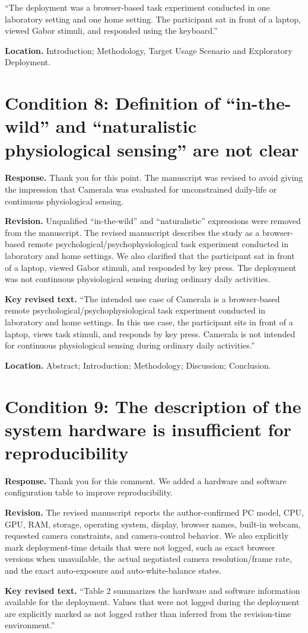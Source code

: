 \documentclass[11pt]{article}
\newcommand{\condition}[2]{\section*{Condition #1: #2}}
\begin{document}
``The deployment was a browser-based task experiment conducted in one laboratory setting and one home setting. The participant sat in front of a laptop, viewed Gabor stimuli, and responded using the keyboard.''

\textbf{Location.}
Introduction; Methodology, Target Usage Scenario and Exploratory Deployment.

\condition{8}{Definition of ``in-the-wild'' and ``naturalistic physiological sensing'' are not clear}
\textbf{Response.}
Thank you for this point.
The manuscript was revised to avoid giving the impression that Camerala was evaluated for unconstrained daily-life or continuous physiological sensing.

\textbf{Revision.}
Unqualified ``in-the-wild'' and ``naturalistic'' expressions were removed from the manuscript.
The revised manuscript describes the study as a browser-based remote psychological/psychophysiological task experiment conducted in laboratory and home settings.
We also clarified that the participant sat in front of a laptop, viewed Gabor stimuli, and responded by key press.
The deployment was not continuous physiological sensing during ordinary daily activities.

\textbf{Key revised text.}
``The intended use case of Camerala is a browser-based remote psychological/psychophysiological task experiment conducted in laboratory and home settings. In this use case, the participant sits in front of a laptop, views task stimuli, and responds by key press. Camerala is not intended for continuous physiological sensing during ordinary daily activities.''

\textbf{Location.}
Abstract; Introduction; Methodology; Discussion; Conclusion.

\condition{9}{The description of the system hardware is insufficient for reproducibility}
\textbf{Response.}
Thank you for this comment.
We added a hardware and software configuration table to improve reproducibility.

\textbf{Revision.}
The revised manuscript reports the author-confirmed PC model, CPU, GPU, RAM, storage, operating system, display, browser names, built-in webcam, requested camera constraints, and camera-control behavior.
We also explicitly mark deployment-time details that were not logged, such as exact browser versions when unavailable, the actual negotiated camera resolution/frame rate, and the exact auto-exposure and auto-white-balance states.

\textbf{Key revised text.}
``Table 2 summarizes the hardware and software information available for the deployment.
Values that were not logged during the deployment are explicitly marked as not logged rather than inferred from the revision-time environment.''
\end{document}
